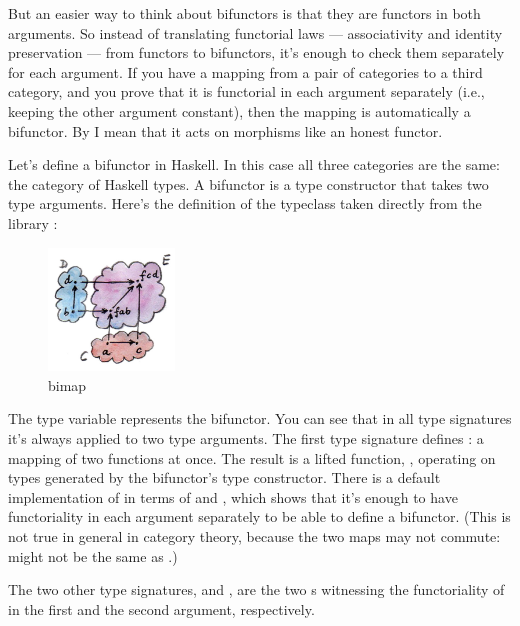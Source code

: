 But an easier way to think about bifunctors is that they are functors in
both arguments. So instead of translating functorial laws ---
associativity and identity preservation --- from functors to bifunctors,
it's enough to check them separately for each argument. If you have a
mapping from a pair of categories to a third category, and you prove
that it is functorial in each argument separately (i.e., keeping the
other argument constant), then the mapping is automatically a bifunctor.
By  I mean that it acts on morphisms like an honest
functor.

Let's define a bifunctor in Haskell. In this case all three categories
are the same: the category of Haskell types. A bifunctor is a type
constructor that takes two type arguments. Here's the definition of the
 typeclass taken directly from the library
:


\begin{figure}[H]
\centering\includegraphics[width=0.3\textwidth]{images/bimap.jpg}
\caption{bimap}
\end{figure}

The type variable  represents the bifunctor. You can see that
in all type signatures it's always applied to two type arguments. The
first type signature defines : a mapping of two functions
at once. The result is a lifted function,
, operating on types
generated by the bifunctor's type constructor. There is a default
implementation of  in terms of  and
, which shows that it's enough to have functoriality in
each argument separately to be able to define a bifunctor.  (This is
not true in general in category theory, because the two maps may not
commute:  might not be the same as 
.)

\noindent
The two other type signatures,  and , are
the two s witnessing the functoriality of  in the
first and the second argument, respectively.


